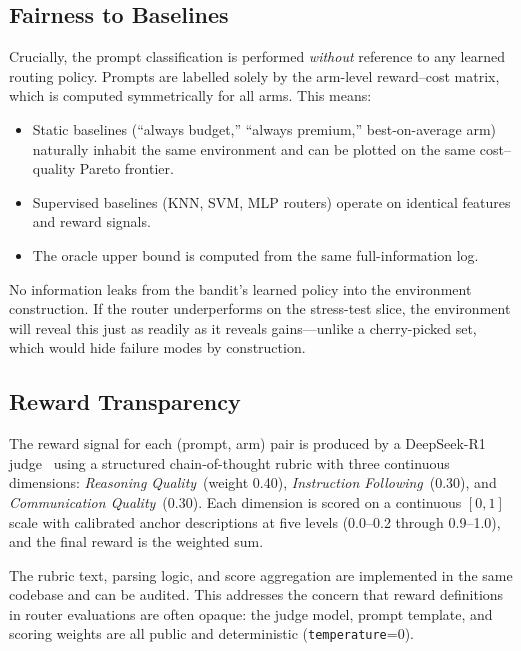 \subsection{Fairness to Baselines}
\label{app:baseline_fairness}

Crucially, the prompt classification is performed \emph{without}
reference to any learned routing policy.
Prompts are labelled solely by the arm-level reward--cost matrix,
which is computed symmetrically for all arms.
This means:

\begin{itemize}[nosep,leftmargin=*]
  \item Static baselines (``always budget,'' ``always premium,''
    best-on-average arm) naturally inhabit the same environment
    and can be plotted on the same cost--quality Pareto frontier.
  \item Supervised baselines (KNN, SVM, MLP routers) operate on
    identical features and reward signals.
  \item The oracle upper bound is computed from the same full-information
    log.
\end{itemize}

No information leaks from the bandit's learned policy into the
environment construction.
If the router underperforms on the stress-test slice, the environment
will reveal this just as readily as it reveals gains---unlike a
cherry-picked set, which would hide failure modes by construction.

\subsection{Reward Transparency}
\label{app:reward_transparency}

The reward signal for each (prompt, arm) pair is produced by a
DeepSeek-R1 judge~\cite{deepseekai2025deepseekr1} using a structured
chain-of-thought rubric with three continuous dimensions:
\emph{Reasoning Quality}~(weight 0.40), \emph{Instruction
Following}~(0.30), and \emph{Communication Quality}~(0.30).
Each dimension is scored on a continuous $[0, 1]$ scale with
calibrated anchor descriptions at five levels (0.0--0.2 through
0.9--1.0), and the final reward is the weighted sum.

The rubric text, parsing logic, and score aggregation are implemented
in the same codebase and can be audited.
This addresses the concern that reward definitions in router
evaluations are often opaque: the judge model, prompt template, and
scoring weights are all public and deterministic (\texttt{temperature}=0).
